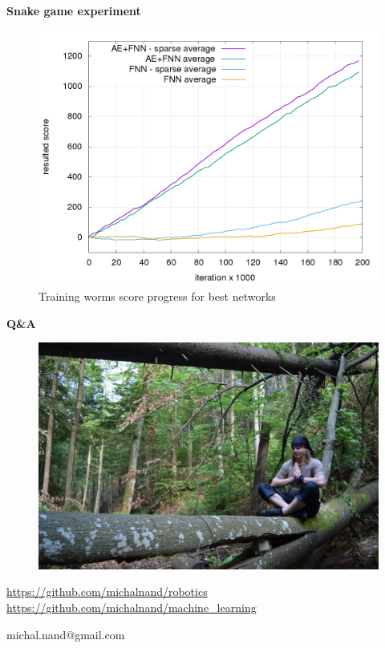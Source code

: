 \documentclass[xcolor=dvipsnames]{beamer}
\begin{document}
\begin{frame}{\bf Snake game experiment}


\begin{figure}[!h]
  \centering
  \includegraphics[scale=0.3]{../../results/rl_worms/training_progress.png}
  \caption*{Training worms score progress for best networks}
  \label{img:Training worms score progress for best networks}
\end{figure}

\end{frame}


\begin{frame}{\bf Q\&A}

\begin{figure}[ht]
\begin{center}
\begin{minipage}{0.8\linewidth}
\begin{center}
 \includegraphics[width=1.0\textwidth]{../../pictures/me.jpg}
\end{center}
\end{minipage}
\end{center}
\end{figure}

\url{https://github.com/michalnand/robotics}
\url{https://github.com/michalnand/machine\_learning}

\centerline{michal.nand@gmail.com}

\end{frame}
\end{document}
